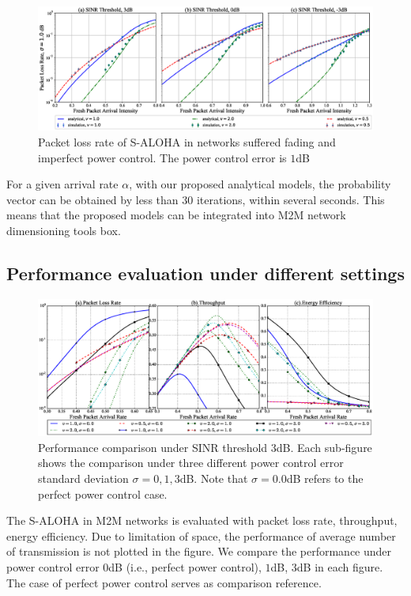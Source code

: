 \begin{figure}[!ht]
	\centering
	\includegraphics[width=1.0\linewidth]{Chapter4/Figures/packet_loss_rate_ci_with_fading_shadowing.eps}
	\caption{Packet loss rate of S-ALOHA in networks suffered fading and imperfect power control. The power control error is $1$dB}
	\label{fig:ci_fading_shadowing}
\end{figure}

For a given arrival rate $\alpha$, with our proposed analytical models, the probability vector can be obtained by less than $30$ iterations, within several seconds. This means that the proposed models can be integrated into M2M network dimensioning tools box.
\subsection{Performance evaluation under different settings}

\begin{figure}[!h]
	\centering
	\includegraphics[width=1.0\linewidth]{Chapter4/Figures/shadowing_performance_case_3.0.eps}
	\caption{Performance comparison under SINR threshold $3$dB. Each sub-figure shows the comparison under three different power control error standard deviation $\sigma = 0, 1, 3$dB. Note that $\sigma=0.0$dB refers to the perfect power control case.}
	\label{fig:shadowing_performance}
\end{figure}

The S-ALOHA in M2M networks is evaluated with packet loss rate, throughput, energy efficiency. Due to limitation of space, the performance of average number of transmission is not plotted in the figure. We compare the performance under power control error $0$dB (i.e., perfect power control), $1$dB, $3$dB in each figure. The case of perfect power control serves as comparison reference.

